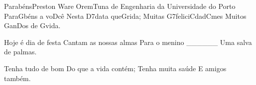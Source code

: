 \begin{musica}{Parabéns}{Preston Ware Orem}{Tuna de Engenharia da Universidade do Porto}
Para\ac{G}{béns} a vo\ac{D}{cê}
Nesta \ac{D7}{da}ta que\ac{G}{ri}da;
Muitas \ac{G7}{fe}lici\ac{C}{da}d\ac{Cm}{es}
Muitos \ac{G}{a}n\ac{D}{os} de \ac{G}{vi}da.

Hoje é dia de festa
Cantam as nossas almas
Para o menino ______
Uma salva de palmas.

Tenha tudo de bom
Do que a vida contém;
Tenha muita saúde
E amigos também.

\end{musica}

